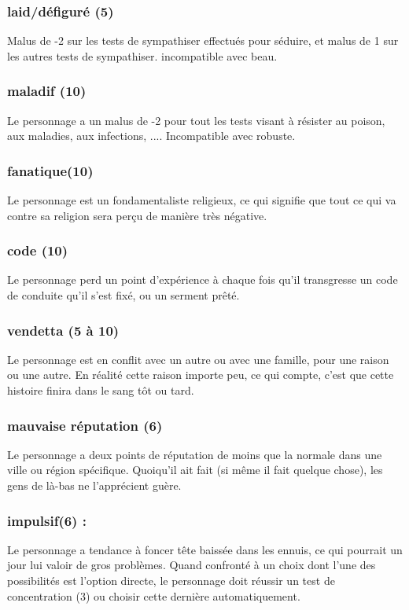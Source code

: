 \documentclass[10pt,a4paper,twocolumn]{book}
\begin{document}
\subsubsection{laid/défiguré (5) } 
Malus de -2 sur les tests de sympathiser effectués pour séduire, et malus de 1 sur les autres tests de sympathiser. incompatible avec beau.
\subsubsection{maladif (10) }
Le personnage a un malus de -2 pour tout les tests visant à résister au poison, aux maladies, aux infections, .... Incompatible avec robuste.
\subsubsection{fanatique(10) }
Le personnage est un fondamentaliste religieux, ce qui signifie que tout ce qui va contre sa religion sera perçu de manière très négative.
\subsubsection{code (10) } 
Le personnage perd un point d'expérience à chaque fois qu'il transgresse un code de conduite qu'il s'est fixé, ou un serment prêté.
\subsubsection{vendetta (5 à 10) }
Le personnage est en conflit avec un autre ou avec une famille, pour une raison ou une autre. En réalité cette raison importe peu, ce qui compte, c'est que cette histoire finira dans le sang tôt ou tard.
\subsubsection{mauvaise réputation (6) } 
Le personnage a deux points de réputation de moins que la normale dans une ville ou région spécifique. Quoiqu'il ait fait (si même il fait quelque chose), les gens de là-bas ne l'apprécient guère.
\subsubsection{impulsif(6) :}
Le personnage a tendance à foncer tête baissée dans les ennuis, ce qui pourrait un jour lui valoir de gros problèmes. Quand confronté à un choix dont l'une des possibilités est l'option directe, le personnage doit réussir un test de concentration (3) ou choisir cette dernière automatiquement.
\end{document}
